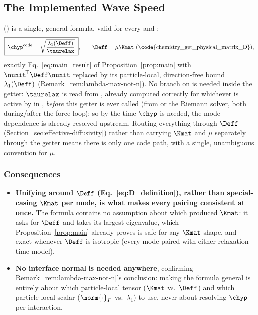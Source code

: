 \subsection{The Implemented Wave Speed}
\label{sec:confrontation}

() is a single, general
formula, valid for every  and
:
\begin{equation}
  \label{eq:code_constant}
  \boxed{\;\chyp^{\rm code} = \sqrt{\frac{\lambda_1(\Deff)}{\taurelax}}\;} ,
  \qquad \Deff=\mu\Kmat\ \text{(\code{chemistry\_get\_physical\_matrix\_D})} ,
\end{equation}
exactly Eq.~\eqref{eq:main_result} of Proposition~\ref{prop:main} with
$\nunit^{\!\top}\Deff\nunit$ replaced by its particle-local, direction-free
bound $\lambda_1(\Deff)$ (Remark~\ref{rem:lambda-max-not-n}). No branch on
 is needed inside the getter: $\taurelax$ is
read from , already computed correctly for
whichever  is active by
 in
, \emph{before} this getter is ever
called (from  or the Riemann solver, both
during/after the force loop); so by the time $\chyp$ is needed, the
mode-dependence is already resolved upstream. Routing everything through
$\Deff$ (Section~\ref{sec:effective-diffusivity}) rather than carrying
$\Kmat$ and $\mu$ separately through the getter means there is only one
code path, with a single, unambiguous convention for $\mu$.

\subsubsection{Consequences}
\begin{itemize}
\item \textbf{Unifying around $\Deff$ (Eq.~\eqref{eq:D_definition}), rather
  than special-casing $\Kmat$ per mode, is what makes every pairing
  consistent at once.} The formula contains no assumption about which
   produced $\Kmat$: it asks for $\Deff$ and takes
  its largest eigenvalue, which Proposition~\ref{prop:main} already proves
  is safe for any $\Kmat$ shape, and exact whenever $\Deff$ is isotropic
  (every mode paired with either relaxation-time model).
\item \textbf{No interface normal is needed anywhere}, confirming
  Remark~\ref{rem:lambda-max-not-n}'s conclusion: making the formula
  general is entirely about which particle-local tensor ($\Kmat$ vs.\
  $\Deff$) and which particle-local scalar ($\norm{\cdot}_F$ vs.\
  $\lambda_1$) to use, never about resolving $\chyp$ per-interaction.
\end{itemize}

